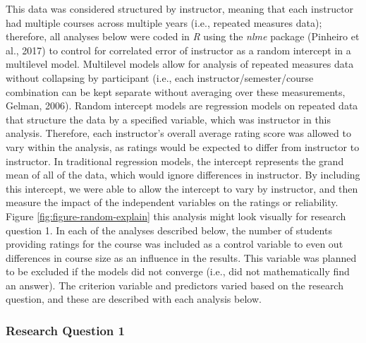 \documentclass[
  man]{apa7}
\begin{document}
This data was considered structured by instructor, meaning that each
instructor had multiple courses across multiple years (i.e., repeated
measures data); therefore, all analyses below were coded in \emph{R} using
the \emph{nlme} package (Pinheiro et al., 2017) to control for correlated error of
instructor as a random intercept in a multilevel model. Multilevel
models allow for analysis of repeated measures data without collapsing
by participant (i.e., each instructor/semester/course combination can be
kept separate without averaging over these measurements, Gelman, 2006).
Random intercept models are regression models on repeated data that
structure the data by a specified variable, which was instructor in this
analysis. Therefore, each instructor's overall average rating score was
allowed to vary within the analysis, as ratings would be expected to differ from instructor to instructor. In traditional regression
models, the intercept represents the grand mean of all of the data,
which would ignore differences in instructor. By including this
intercept, we were able to allow the intercept to vary by instructor,
and then measure the impact of the independent variables on the ratings
or reliability. Figure \ref{fig:figure-random-explain} this analysis might look visually for research question 1. In each of
the analyses described below, the number of students providing ratings
for the course was included as a control variable to even out
differences in course size as an influence in the results. This variable
was planned to be excluded if the models did not converge (i.e., did not
mathematically find an answer). The criterion variable and predictors
varied based on the research question, and these are described with each
analysis below.

\hypertarget{research-question-1}{%
\subsubsection{Research Question 1}\label{research-question-1}}
\end{document}
